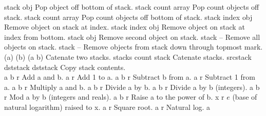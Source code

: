 \begin{longtable}{}
\hline
\optableent
	{stack}
	{{\bf {}}}
	{obj}
	{Pop object off bottom of stack.}
\hline
\optableent
	{stack count}
	{{\bf {}}}
	{array}
	{Pop count objects off stack.}
\hline
\optableent
	{stack count}
	{{\bf {}}}
	{array}
	{Pop count objects off bottom of stack.}
\hline
\optableent
	{stack index}
	{{\bf {}}}
	{obj}
	{Remove object on stack at index.}
\hline
\optableent
	{stack index}
	{{\bf {}}}
	{obj}
	{Remove object on stack at index from bottom.}
\hline
\optableent
	{stack}
	{{\bf {}}}
	{obj}
	{Remove second object on stack.}
\hline
\optableent
	{stack}
	{{\bf {}}}
	{--}
	{Remove all objects on stack.}
\hline
\optableent
	{stack}
	{{\bf {}}}
	{--}
	{Remove objects from stack down through topmost mark.}
\hline
\optableent
	{(a) (b)}
	{{\bf {}}}
	{(a b)}
	{Catenate two stacks.}
\hline
\optableent
	{stacks count}
	{{\bf {}}}
	{stack}
	{Catenate stacks.}
\hline
\optableent
	{srcstack dststack}
	{{\bf {}}}
	{dststack}
	{Copy stack contents.}
\hline \hline
{} \\
\hline \hline
\optableent
	{a b}
	{{\bf {}}}
	{r}
	{Add a and b.}
\hline
\optableent
	{a}
	{{\bf {}}}
	{r}
	{Add 1 to a.}
\hline
\optableent
	{a b}
	{{\bf {}}}
	{r}
	{Subtract b from a.}
\hline
\optableent
	{a}
	{{\bf {}}}
	{r}
	{Subtract 1 from a.}
\hline
\optableent
	{a b}
	{{\bf {}}}
	{r}
	{Multiply a and b.}
\hline
\optableent
	{a b}
	{{\bf {}}}
	{r}
	{Divide a by b.}
\hline
\optableent
	{a b}
	{{\bf {}}}
	{r}
	{Divide a by b (integers).}
\hline
\optableent
	{a b}
	{{\bf {}}}
	{r}
	{Mod a by b (integers and reals).}
\hline
\optableent
	{a b}
	{{\bf {}}}
	{r}
	{Raise a to the power of b.}
\hline
\optableent
	{x}
	{{\bf {}}}
	{r}
	{$e$ (base of natural logarithm) raised to x.}
\hline
\optableent
	{a}
	{{\bf {}}}
	{r}
	{Square root.}
\hline
\optableent
	{a}
	{{\bf {}}}
	{r}
	{Natural log.}
\hline
\optableent
	{a}
	{{\bf {}}}

\end{longtable}
